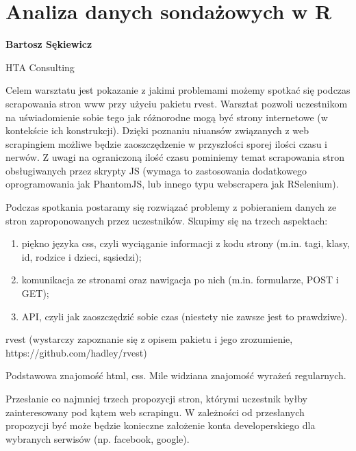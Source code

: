 \documentclass[\main/boa.tex]{subfiles}
\begin{document}
\section{Analiza danych sondażowych w R}

\begin{minipage}{0.915\textwidth}
\centering
{\bf {} Bartosz Sękiewicz}
\end{minipage}

\vskip 0.3cm

\begin{affiliations}
\begin{minipage}{0.915\textwidth}
\centering
\large HTA Consulting  \\[2pt]
\end{minipage}
\end{affiliations}

\vskip 0.8cm

\opiswarsztatu Celem warsztatu jest pokazanie z jakimi problemami możemy spotkać się podczas scrapowania stron www przy użyciu pakietu rvest. Warsztat pozwoli uczestnikom na uświadomienie sobie tego jak różnorodne mogą być strony internetowe (w kontekście ich konstrukcji). Dzięki poznaniu niuansów związanych z web scrapingiem możliwe będzie zaoszczędzenie w przyszłości sporej ilości czasu i nerwów. Z uwagi na ograniczoną ilość czasu pominiemy temat scrapowania stron obsługiwanych przez skrypty JS (wymaga to zastosowania dodatkowego oprogramowania jak PhantomJS, lub innego typu webscrapera jak RSelenium).

\planwarsztatu Podczas spotkania postaramy się rozwiązać problemy z pobieraniem danych ze stron zaproponowanych przez uczestników. Skupimy się na trzech aspektach:
\begin{enumerate}
\item piękno języka css, czyli wyciąganie informacji z kodu strony (m.in. tagi, klasy, id, rodzice i dzieci, sąsiedzi);
\item komunikacja ze stronami oraz nawigacja po nich (m.in. formularze, POST i GET);
\item API, czyli jak zaoszczędzić sobie czas (niestety nie zawsze jest to prawdziwe).
\end{enumerate}	 

\pakiety rvest (wystarczy zapoznanie się z opisem pakietu i jego zrozumienie, https://github.com/hadley/rvest)

\umiejetnosci Podstawowa znajomość html, css. Mile widziana znajomość wyrażeń regularnych.

\wymagania Przesłanie co najmniej trzech propozycji stron, którymi uczestnik byłby zainteresowany pod kątem web scrapingu. W zależności od przesłanych propozycji być może będzie konieczne założenie konta developerskiego dla wybranych serwisów (np. facebook, google).
\end{document}
